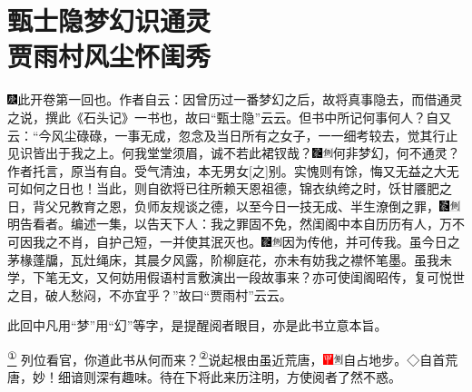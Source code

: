 

\chapter{甄士隐梦幻识通灵\\贾雨村风尘怀闺秀}

{\includegraphics[width=3mm]{../Images/00004}\kaishu 此开卷第一回也。作者自云：因曾历过一番梦幻之后，故将真事隐去，而借通灵之说，撰此《石头记》一书也，故曰``甄士隐''云云。但书中所记何事何人？自又云：``今风尘碌碌，一事无成，忽念及当日所有之女子，一一细考较去，觉其行止见识皆出于我之上。何我堂堂须眉，诚不若此裙钗哉？{\includegraphics[width=3mm]{../Images/00006}\includegraphics[width=3mm]{../Images/00011}\footnotesize \kaishu 何非梦幻，何不通灵？作者托言，原当有自。受气清浊，本无男女{[}之{]}别。}实愧则有馀，悔又无益之大无可如何之日也！当此，则自欲将已往所赖天恩祖德，锦衣纨绔之时，饫甘餍肥之日，背父兄教育之恩，负师友规谈之德，以至今日一技无成、半生潦倒之罪，{\includegraphics[width=3mm]{../Images/00006}\includegraphics[width=3mm]{../Images/00011}\footnotesize \kaishu 明告看者。}编述一集，以告天下人：我之罪固不免，然闺阁中本自历历有人，万不可因我之不肖，自护己短，一并使其泯灭也。{\includegraphics[width=3mm]{../Images/00006}\includegraphics[width=3mm]{../Images/00011}\footnotesize \kaishu 因为传他，并可传我。}虽今日之茅椽蓬牖，瓦灶绳床，其晨夕风露，阶柳庭花，亦未有妨我之襟怀笔墨。虽我未学，下笔无文，又何妨用假语村言敷演出一段故事来？亦可使闺阁昭传，复可悦世之目，破人愁闷，不亦宜乎？''故曰``贾雨村''云云。

此回中凡用``梦''用``幻''等字，是提醒阅者眼目，亦是此书立意本旨。}\href{../Text/part0005_split_000.html\#lnkback_1_a}{\textsuperscript{①}}
\yahei 列位看官，你道此书从何而来？\href{../Text/part0005_split_000.html\#lnkback_2_a}{\textsuperscript{②}}说起根由虽近荒唐，{\includegraphics[width=3mm]{../Images/00002}\includegraphics[width=3mm]{../Images/00011}\footnotesize \kaishu 自占地步。◇自首荒唐，妙！}细谙则深有趣味。待在下将此来历注明，方使阅者了然不惑。

